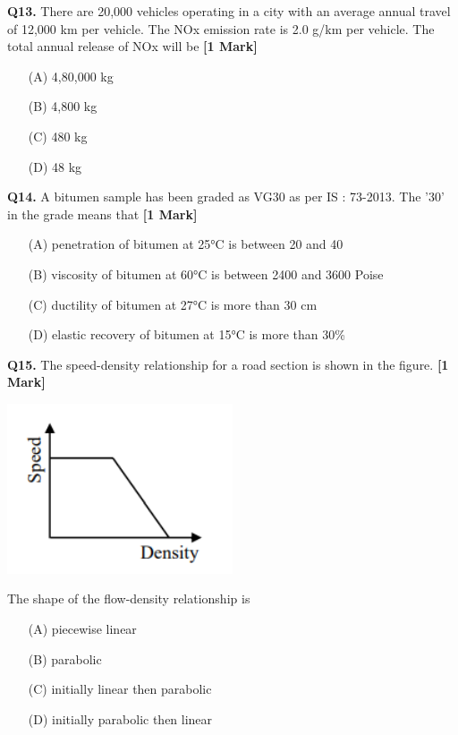 \documentclass[11pt]{article}
\newcommand{\questiona}[2]{
    \noindent\textbf{Q#2.} #1 \hfill \textbf{[1 Mark]}
}
\begin{document}
\questiona{There are 20,000 vehicles operating in a city with an average annual travel of 12,000 km per vehicle. The NOx emission rate is 2.0 g/km per vehicle. The total annual release of NOx will be}{13}
\begin{enumerate}
    \item[(A)] 4,80,000 kg
    \item[(B)] 4,800 kg
    \item[(C)] 480 kg
    \item[(D)] 48 kg
\end{enumerate}
\vspace{0.5cm}

\questiona{A bitumen sample has been graded as VG30 as per IS : 73-2013. The '30' in the grade means that}{14}
\begin{enumerate}
    \item[(A)] penetration of bitumen at 25°C is between 20 and 40
    \item[(B)] viscosity of bitumen at 60°C is between 2400 and 3600 Poise
    \item[(C)] ductility of bitumen at 27°C is more than 30 cm
    \item[(D)] elastic recovery of bitumen at 15°C is more than 30\%
\end{enumerate}
\vspace{0.5cm}

\questiona{The speed-density relationship for a road section is shown in the figure.}{15}
\begin{center}
\includegraphics[width=0.5\textwidth]{figures/q15}
\end{center}
The shape of the flow-density relationship is
\begin{enumerate}
    \item[(A)] piecewise linear
    \item[(B)] parabolic
    \item[(C)] initially linear then parabolic
    \item[(D)] initially parabolic then linear
\end{enumerate}
\vspace{0.5cm}
\end{document}
